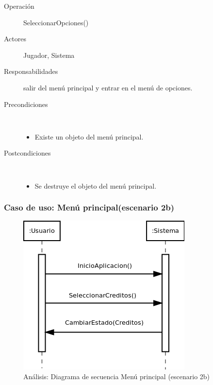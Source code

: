 \begin{description}
    \item [Operación] SeleccionarOpciones()
    \item [Actores] Jugador, Sistema
    \item [Responsabilidades] salir del menú principal y entrar en el menú de opciones.
    \item [Precondiciones] $\quad$
        \begin{itemize}
            \item Existe un objeto del menú principal.
        \end{itemize}
    \item [Postcondiciones] $\quad$
        \begin{itemize}
            \item Se destruye el objeto del menú principal.
        \end{itemize}
\end{description}

\subsubsection{Caso de uso: Menú principal(escenario 2b)}

\begin{figure}[H] 
  \label{secuencia_menu_principal3}
  \begin{center}
    \includegraphics[scale=0.7]{imagenes/analisis/secuencia_menu_principal3.png}
  \end{center}
  \caption{Análisis: Diagrama de secuencia Menú principal (escenario 2b)}
\end{figure}

